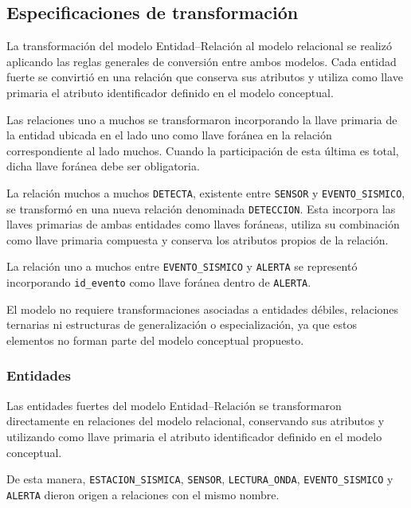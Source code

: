 \documentclass[12pt,a4paper]{article}
\begin{document}
\subsection{Especificaciones de transformación}

La transformación del modelo Entidad--Relación al modelo relacional se realizó aplicando las reglas generales de conversión entre ambos modelos. Cada entidad fuerte se convirtió en una relación que conserva sus atributos y utiliza como llave primaria el atributo identificador definido en el modelo conceptual.

Las relaciones uno a muchos se transformaron incorporando la llave primaria de la entidad ubicada en el lado uno como llave foránea en la relación correspondiente al lado muchos. Cuando la participación de esta última es total, dicha llave foránea debe ser obligatoria.

La relación muchos a muchos \texttt{DETECTA}, existente entre \texttt{SENSOR} y \texttt{EVENTO\_\allowbreak{}SISMICO}, se transformó en una nueva relación denominada \texttt{DETECCION}. Esta incorpora las llaves primarias de ambas entidades como llaves foráneas, utiliza su combinación como llave primaria compuesta y conserva los atributos propios de la relación.

La relación uno a muchos entre \texttt{EVENTO\_\allowbreak{}SISMICO} y \texttt{ALERTA} se representó incorporando \texttt{id\_\allowbreak{}evento} como llave foránea dentro de \texttt{ALERTA}.

El modelo no requiere transformaciones asociadas a entidades débiles, relaciones ternarias ni estructuras de generalización o especialización, ya que estos elementos no forman parte del modelo conceptual propuesto.


\subsubsection{Entidades}

Las entidades fuertes del modelo Entidad--Relación se transformaron directamente en relaciones del modelo relacional, conservando sus atributos y utilizando como llave primaria el atributo identificador definido en el modelo conceptual.

De esta manera, \texttt{ESTACION\_\allowbreak{}SISMICA}, \texttt{SENSOR}, \texttt{LECTURA\_\allowbreak{}ONDA}, \texttt{EVENTO\_\allowbreak{}SISMICO} y \texttt{ALERTA} dieron origen a relaciones con el mismo nombre.
\end{document}
